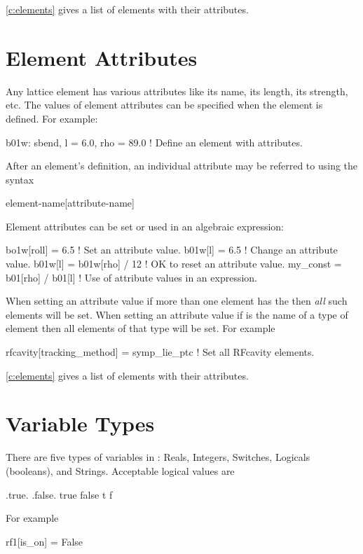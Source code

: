 \cref{c:elements} gives a list of elements with their attributes.

\section{Element Attributes}

Any lattice element has various attributes like its name, its length,
its strength, etc. The values of element attributes can be specified
when the element is defined. For example:
\begin{example}
  b01w: sbend, l = 6.0, rho = 89.0 ! Define an element with attributes.
\end{example}
After an element's definition, an individual attribute may be referred
to using the syntax
\begin{example}
  element-name[attribute-name]
\end{example}
Element attributes can be set or used in an algebraic expression:
\begin{example}
  bo1w[roll] = 6.5                  ! Set an attribute value.
  b01w[l] = 6.5                     ! Change an attribute value.
  b01w[l] = b01w[rho] / 12          ! OK to reset an attribute value.
  my_const = b01[rho] / b01[l]      ! Use of attribute values in an expression.
\end{example}
When setting an attribute value if more than one element has the
 then {\it all} such elements will be set.  When setting an
attribute value if  is the name of a type of element
then all elements of that type will be set. For example
\begin{example}
  rfcavity[tracking_method] = symp_lie_ptc ! Set all RFcavity elements.
\end{example}

\cref{c:elements} gives a list of elements with their attributes.

\section{Variable Types}

There are five types of variables in \bmad: Reals, Integers, Switches,
Logicals (booleans), and Strings. Acceptable logical values are
\begin{example}
  .true.  .false.
   true    false
   t       f
\end{example}
For example
\begin{example}
  rf1[is_on] = False
\end{example}


